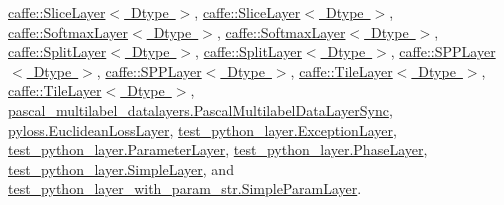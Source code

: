 \mbox{\hyperlink{classcaffe_1_1_slice_layer}{caffe\+::\+Slice\+Layer$<$ Dtype $>$}}, \mbox{\hyperlink{classcaffe_1_1_slice_layer}{caffe\+::\+Slice\+Layer$<$ Dtype $>$}}, \mbox{\hyperlink{classcaffe_1_1_softmax_layer}{caffe\+::\+Softmax\+Layer$<$ Dtype $>$}}, \mbox{\hyperlink{classcaffe_1_1_softmax_layer}{caffe\+::\+Softmax\+Layer$<$ Dtype $>$}}, \mbox{\hyperlink{classcaffe_1_1_split_layer}{caffe\+::\+Split\+Layer$<$ Dtype $>$}}, \mbox{\hyperlink{classcaffe_1_1_split_layer}{caffe\+::\+Split\+Layer$<$ Dtype $>$}}, \mbox{\hyperlink{classcaffe_1_1_s_p_p_layer}{caffe\+::\+S\+P\+P\+Layer$<$ Dtype $>$}}, \mbox{\hyperlink{classcaffe_1_1_s_p_p_layer}{caffe\+::\+S\+P\+P\+Layer$<$ Dtype $>$}}, \mbox{\hyperlink{classcaffe_1_1_tile_layer}{caffe\+::\+Tile\+Layer$<$ Dtype $>$}}, \mbox{\hyperlink{classcaffe_1_1_tile_layer}{caffe\+::\+Tile\+Layer$<$ Dtype $>$}}, \mbox{\hyperlink{classpascal__multilabel__datalayers_1_1_pascal_multilabel_data_layer_sync}{pascal\+\_\+multilabel\+\_\+datalayers.\+Pascal\+Multilabel\+Data\+Layer\+Sync}}, \mbox{\hyperlink{classpyloss_1_1_euclidean_loss_layer}{pyloss.\+Euclidean\+Loss\+Layer}}, \mbox{\hyperlink{classtest__python__layer_1_1_exception_layer}{test\+\_\+python\+\_\+layer.\+Exception\+Layer}}, \mbox{\hyperlink{classtest__python__layer_1_1_parameter_layer}{test\+\_\+python\+\_\+layer.\+Parameter\+Layer}}, \mbox{\hyperlink{classtest__python__layer_1_1_phase_layer}{test\+\_\+python\+\_\+layer.\+Phase\+Layer}}, \mbox{\hyperlink{classtest__python__layer_1_1_simple_layer}{test\+\_\+python\+\_\+layer.\+Simple\+Layer}}, and \mbox{\hyperlink{classtest__python__layer__with__param__str_1_1_simple_param_layer}{test\+\_\+python\+\_\+layer\+\_\+with\+\_\+param\+\_\+str.\+Simple\+Param\+Layer}}.

